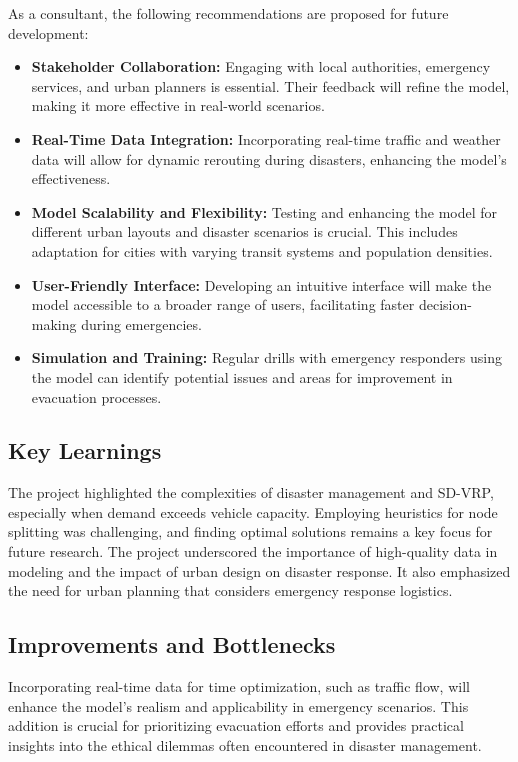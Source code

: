 \documentclass[12pt]{article}
\begin{document}
As a consultant, the following recommendations are proposed for future development:
\begin{itemize}
    \item \textbf{Stakeholder Collaboration:} Engaging with local authorities, emergency services, and urban planners is essential. Their feedback will refine the model, making it more effective in real-world scenarios.

    \item \textbf{Real-Time Data Integration:} Incorporating real-time traffic and weather data will allow for dynamic rerouting during disasters, enhancing the model's effectiveness.

    \item \textbf{Model Scalability and Flexibility:} Testing and enhancing the model for different urban layouts and disaster scenarios is crucial. This includes adaptation for cities with varying transit systems and population densities.

    \item \textbf{User-Friendly Interface:} Developing an intuitive interface will make the model accessible to a broader range of users, facilitating faster decision-making during emergencies.

    \item \textbf{Simulation and Training:} Regular drills with emergency responders using the model can identify potential issues and areas for improvement in evacuation processes.
\end{itemize}
\subsection{Key Learnings}
The project highlighted the complexities of disaster management and SD-VRP, especially when demand exceeds vehicle capacity. Employing heuristics for node splitting was challenging, and finding optimal solutions remains a key focus for future research. The project underscored the importance of high-quality data in modeling and the impact of urban design on disaster response. It also emphasized the need for urban planning that considers emergency response logistics.

\subsection{Improvements and Bottlenecks}
Incorporating real-time data for time optimization, such as traffic flow, will enhance the model's realism and applicability in emergency scenarios. This addition is crucial for prioritizing evacuation efforts and provides practical insights into the ethical dilemmas often encountered in disaster management.
\end{document}
